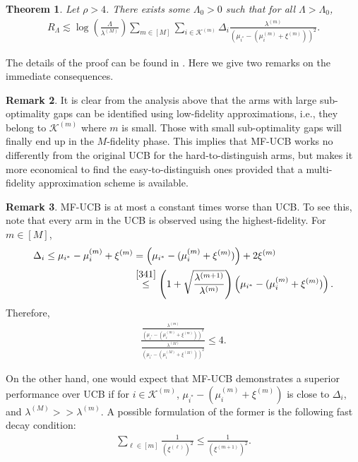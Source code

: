 \documentclass[letterpaper,11pt,openright,openany]{book}
\numberwithin{equation}{section}
\theoremstyle{plain}
\newtheorem{Th}{Theorem}[section]
\theoremstyle{definition}
\newtheorem{Rem}[Th]{Remark}
\begin{document}
\begin{Th}
Let $\rho>4$. There exists some $\Lambda_0>0$ such that for all $\Lambda>\Lambda_0$, 
\begin{align*}
R_\Lambda \lesssim\log\left(\frac{\Lambda}{\lambda^{(M)}}\right)\sum_{m\in [M]}\sum_{i\in\mathcal K^{(m)}}\Delta_i\frac{\lambda^{(m)}}{\left(\mu_{i^*}-(\mu^{(m)}_i+\xi^{(m)})\right)^2}.
\end{align*}
\end{Th}

The details of the proof can be found in \cite{kandasamy2016multi}. Here we give two remarks on the immediate consequences. 

\begin{Rem}
It is clear from the analysis above that the arms with large sub-optimality gaps can be identified using low-fidelity approximations, i.e., they belong to $\mathcal K^{(m)}$ where $m$ is small. Those with small sub-optimality gaps will finally end up in the $M$-fidelity phase. This implies that MF-UCB works no differently from the original UCB for the hard-to-distinguish arms, but makes it more economical to find the easy-to-distinguish ones provided that a multi-fidelity approximation scheme is available. 
\end{Rem}

\begin{Rem}
MF-UCB is at most a constant times worse than UCB. To see this, note that every arm in the UCB is observed using the highest-fidelity. For $m\in [M]$,  
\begin{align*}
\Delta_i\leq\mu_{i^*}-\mu^{(m)}_i+\xi^{(m)}&=\left(\mu_{i^*}-(\mu^{(m)}_i+\xi^{(m)})\right)+2\xi^{(m)}\\
&\stackrel{\eqref{341}}{\leq} \left(1+\sqrt{\frac{\lambda^{(m+1)}}{\lambda^{(m)}}}\right)\left(\mu_{i^*}-(\mu^{(m)}_i+\xi^{(m)})\right).
\end{align*}
Therefore,
\begin{align*}
\frac{\frac{\lambda^{(m)}}{\left(\mu_{i^*}-(\mu^{(m)}_i+\xi^{(m)})\right)^2}}{\frac{\lambda^{(M)}}{\left(\mu_{i^*}-(\mu^{(M)}_i+\xi^{(M)})\right)^2}}\leq 4.
\end{align*}

On the other hand, one would expect that MF-UCB demonstrates a superior performance over UCB if for $i\in\mathcal K^{(m)}$, $\mu_{i^*}-(\mu^{(m)}_i+\xi^{(m)})$ is close to $\Delta_i$, and $\lambda^{(M)}>>\lambda^{(m)}$. A possible formulation of the former is the following fast decay condition:
\begin{align*}
\sum_{\ell\in [m]}\frac{1}{(\xi^{(\ell)})^2}\leq\frac{1}{(\xi^{(m+1)})^2}. 
\end{align*} 
\end{Rem}
\end{document}
